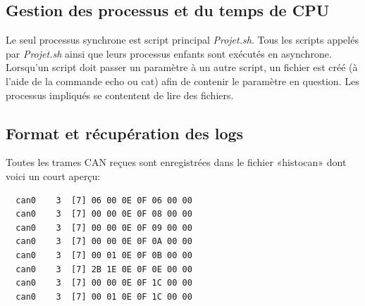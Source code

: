 \documentclass[10pt,a4paper,final]{article}
\begin{document}
\begin{spacing}{1.5}
\subsection{Gestion des processus et du temps de CPU}
Le seul processus synchrone est script principal \textit{Projet.sh}. Tous les scripts appelés par \textit{Projet.sh} ainsi que leurs processus enfants sont exécutés en asynchrone. Lorsqu'un script doit passer un paramètre à un autre script, un fichier est créé (à l'aide de la commande echo ou cat) afin de contenir le paramètre en question. Les processus impliqués se contentent de lire des fichiers.

\subsection{Format et récupération des logs}
Toutes les trames CAN reçues sont enregistrées dans le fichier «histocan» dont voici un court aperçu:
\end{spacing}

\begin{verbatim}
  can0    3  [7] 06 00 0E 0F 06 00 00
  can0    3  [7] 00 00 0E 0F 08 00 00
  can0    3  [7] 00 00 0E 0F 09 00 00
  can0    3  [7] 00 00 0E 0F 0A 00 00
  can0    3  [7] 00 01 0E 0F 0B 00 00
  can0    3  [7] 2B 1E 0E 0F 0E 00 00
  can0    3  [7] 00 00 0E 0F 1C 00 00
  can0    3  [7] 00 01 0E 0F 1C 00 00
\end{verbatim}
\end{document}

